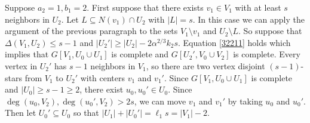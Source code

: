 \documentclass[oneside,12pt]{memoir}
\begin{document}
Suppose $a_2=1, b_1=2$.  First suppose that there exists $v_1\in V_1$ with at least $s$ neighbors in $U_2$.  Let $L\subseteq N(v_1)\cap U_2$ with $|L|=s$.  In this case we can apply the argument of the previous paragraph to the sets $V_1\setminus v_1$ and $U_2\setminus L$.  
So suppose that $\Delta(V_1, U_2)\leq s-1$ and $|U_2'|\geq |U_2|-2\alpha^{2/3}k_2s$.  Equation \eqref{32211} holds which implies that $G[V_1, U_0\cup U_1]$ is complete and $G[U_2', V_0\cup V_2]$ is complete.  Every vertex in $U_2'$ has $s-1$ neighbors in $V_1$, so there are two vertex disjoint $(s-1)$-stars from $V_1$ to $U_2'$ with centers $v_1$ and $v_1'$.  Since $G[V_1, U_0\cup U_1]$ is complete and $|U_0|\geq s-1\geq 2$, there exist $u_0, u_0'\in U_0$.  Since $\deg(u_0, V_2), \deg(u_0', V_2)>2s$, we can move $v_1$ and $v_1'$ by taking $u_0$ and $u_0'$.  Then let $U_0'\subseteq U_0$ so that $|U_1|+|U_0'|=\ell_1s=|V_1|-2$.

\end{document}
